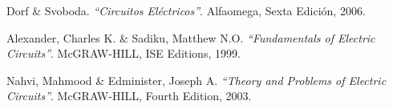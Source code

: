 \documentclass[twocolumn]{IEEEtran}
\begin{document}

\begin{thebibliography}{99}
 Dorf  \& Svoboda.
{\em "`Circuitos Eléctricos"'}.
Alfaomega, Sexta Edición, 2006.

 Alexander, Charles K. \&  Sadiku, Matthew N.O.
{\em "`Fundamentals of Electric Circuits"'}.
McGRAW-HILL, ISE Editions, 1999.

 Nahvi, Mahmood \& Edminister, Joseph A.
{\em "`Theory and Problems of Electric Circuits"'}.
McGRAW-HILL, Fourth Edition, 2003.
\end{thebibliography}
\end{document}
